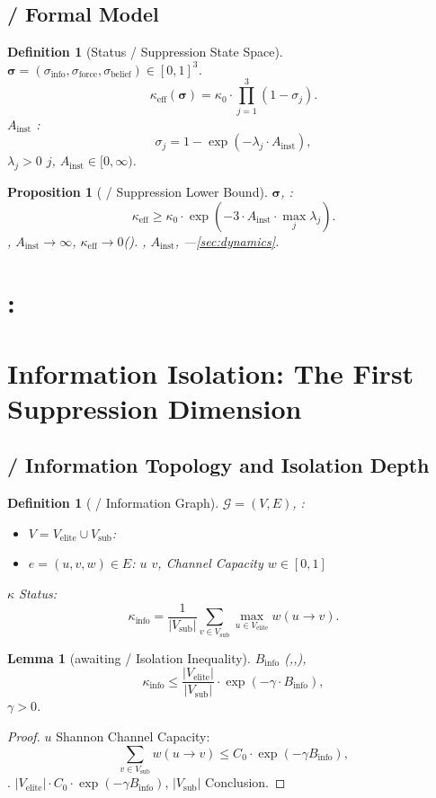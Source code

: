 \documentclass[11pt,a4paper]{article}
\newtheorem{lemma}[theorem]{Lemma}
\newtheorem{proposition}[theorem]{Proposition}
\newtheorem{definition}[theorem]{Definition}
\theoremstyle{definition}
\newcommand{\coupling}{\kappa}
\newcommand{\suppress}{\sigma}
\newcommand{\paren}[1]{\left(#1\right)}
\begin{document}
\subsection{ / Formal Model}
\begin{definition}[Status / Suppression State Space]
\label{def:suppress_space}
 $\bm{\suppress} = (\suppress_{\text{info}}, \suppress_{\text{force}}, \suppress_{\text{belief}}) \in [0,1]^3$.
\[
\coupling_{\text{eff}}(\bm{\suppress}) = \coupling_0 \cdot \prod_{j=1}^{3} (1 - \suppress_j).
\]
 $A_{\text{inst}}$ : 
\[
\suppress_j = 1 - \exp\paren{-\lambda_j \cdot A_{\text{inst}}},
\]
 $\lambda_j > 0$ $j$, $A_{\text{inst}} \in [0, \infty)$.
\end{definition}
\begin{proposition}[ / Suppression Lower Bound]
\label{prop:lower_bound}
 $\bm{\suppress}$, : 
\[
\coupling_{\text{eff}} \geq \coupling_0 \cdot \exp\paren{-3 \cdot A_{\text{inst}} \cdot \max_j \lambda_j}.
\]
, $A_{\text{inst}} \to \infty$, $\coupling_{\text{eff}} \to 0$().
, $A_{\text{inst}}$, ---\ref{sec:dynamics}.
\end{proposition}
\section{:}
\section{Information Isolation: The First Suppression Dimension}
\subsection{ / Information Topology and Isolation Depth}
\begin{definition}[ / Information Graph]
\label{def:info_graph}
 $\mathcal{G} = (V, E)$, : 
\begin{itemize}
 \item $V = V_{\text{elite}} \cup V_{\text{sub}}$: 
 \item $e = (u, v, w) \in E$: $u$ $v$, Channel Capacity $w \in [0,1]$
\end{itemize}
$\coupling$ Status: 
\[
\coupling_{\text{info}} = \frac{1}{|V_{\text{sub}}|}
 \sum_{v \in V_{\text{sub}}} \max_{u \in V_{\text{elite}}} w(u \to v).
\]
\end{definition}
\begin{lemma}[awaiting / Isolation Inequality]
\label{lem:isolation}
 $B_{\text{info}}$ (,,), 
\[
\coupling_{\text{info}} \leq \frac{|V_{\text{elite}}|}{|V_{\text{sub}}|} \cdot
 \exp\paren{-\gamma \cdot B_{\text{info}}},
\]
 $\gamma > 0$.
\end{lemma}
\begin{proof}
 $u$ Shannon Channel Capacity: 
\[
\sum_{v \in V_{\text{sub}}} w(u \to v) \leq C_0 \cdot \exp(-\gamma B_{\text{info}}),
\]
. $|V_{\text{elite}}| \cdot C_0 \cdot \exp(-\gamma B_{\text{info}})$, 
 $|V_{\text{sub}}|$ Conclusion.
\end{proof}
\end{document}
